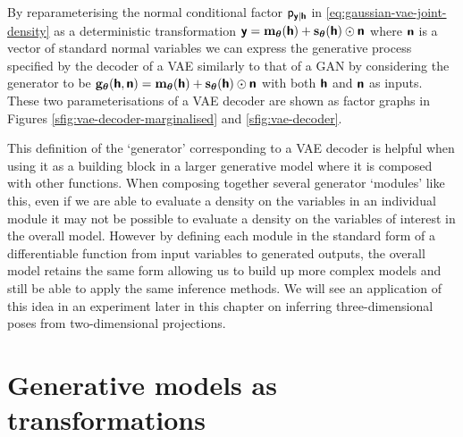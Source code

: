 By reparameterising the normal conditional factor $\mathsf{p}_{\boldsymbol{\mathsf{y}}|\boldsymbol{\mathsf{h}}}$ in \eqref{eq:gaussian-vae-joint-density} as a deterministic transformation $\boldsymbol{\mathsf{y}} = {\mathbf{m}}_{\boldsymbol{\theta}}(\boldsymbol{\mathsf{h}}) + {\mathbf{s}}_{\boldsymbol{\theta}}(\boldsymbol{\mathsf{h}}) \odot \boldsymbol{\mathsf{n}}$ where $\boldsymbol{\mathsf{n}}$ is a vector of standard normal variables we can express the generative process specified by the decoder of a \ac{VAE} similarly to that of a \ac{GAN} by considering the generator to be ${\mathbf{g}}_{\boldsymbol{\theta}}(\boldsymbol{\mathsf{h}},\boldsymbol{\mathsf{n}}) = {\mathbf{m}}_{\boldsymbol{\theta}}(\boldsymbol{\mathsf{h}}) + {\mathbf{s}}_{\boldsymbol{\theta}}(\boldsymbol{\mathsf{h}}) \odot \boldsymbol{\mathsf{n}}$ with both $\boldsymbol{\mathsf{h}}$ and $\boldsymbol{\mathsf{n}}$ as inputs. These two parameterisations of a \ac{VAE} decoder are shown as factor graphs in Figures \ref{sfig:vae-decoder-marginalised} and \ref{sfig:vae-decoder}. 

This definition of the `generator' corresponding to a \ac{VAE} decoder is helpful when using it as a building block in a larger generative model where it is composed with other functions. When composing together several generator `modules' like this, even if we are able to evaluate a density on the variables in an individual module it may not be possible to evaluate a density on the variables of interest in the overall model. However by defining each module in the standard form of a differentiable function from input variables to generated outputs, the overall model retains the same form allowing us to build up more complex models and still be able to apply the same inference methods. We will see an application of this idea in an experiment later in this chapter on inferring three-dimensional poses from two-dimensional projections.


\section{Generative models as transformations}\label{sec:generative-models-as-transformations}



